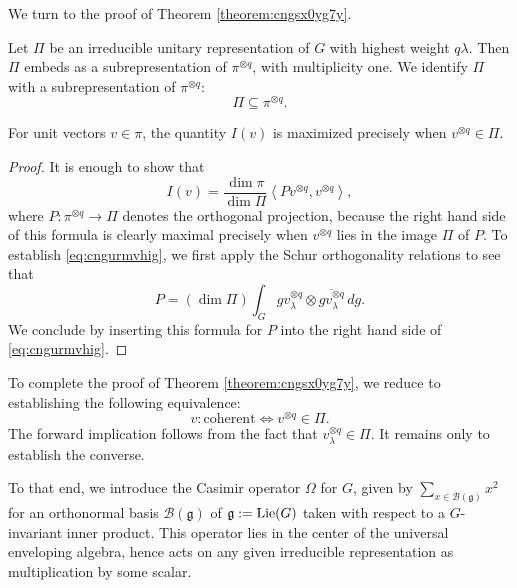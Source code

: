 \documentclass[reqno]{amsart} 
\begin{document}
We turn to the proof of Theorem \ref{theorem:cngsx0yg7y}.

Let $\Pi$ be an irreducible unitary representation of $G$ with highest weight $q \lambda$.  Then $\Pi$ embeds as a subrepresentation of $\pi^{\otimes q}$, with multiplicity one.  We identify $\Pi$ with a subrepresentation of $\pi^{\otimes q}$:
\begin{equation*}
  \Pi \subseteq  \pi^{\otimes q}. 
\end{equation*}
\begin{lemma}\label{lemma:cngurf0apf}
  For unit vectors $v \in \pi$, the quantity $I(v)$ is maximized precisely when $v^{\otimes q} \in \Pi$.
\end{lemma}
\begin{proof}
  It is enough to show that
  \begin{equation}\label{eq:cngurmvhig}
    I(v) = \frac{\dim \pi}{\dim \Pi}
    \left\langle P v^{\otimes q}, v^{\otimes q} \right\rangle,
  \end{equation}
  where $P : \pi^{\otimes q} \rightarrow \Pi$ denotes the orthogonal projection, because the right hand side of this formula is clearly maximal precisely when $v^{\otimes q}$ lies in the image $\Pi$ of $P$.  To establish \eqref{eq:cngurmvhig}, we first apply the Schur orthogonality relations to see that
  \begin{equation*}
    P =(\dim \Pi) \int_{G} g v_\lambda^{\otimes q}
    \otimes \overline{g v_\lambda^{\otimes q}} \, d g. 
  \end{equation*}
  We conclude by inserting this formula for $P$ into the right hand side of \eqref{eq:cngurmvhig}.
\end{proof}

To complete the proof of Theorem \ref{theorem:cngsx0yg7y}, we reduce to establishing the following equivalence:
\begin{equation}\label{eq:cngsx4hl1k}
  v:\text{coherent} \iff v^{\otimes q} \in \Pi.
\end{equation}
The forward implication follows from the fact that $v_{\lambda}^{\otimes q} \in \Pi$.  It remains only to establish the converse.

To that end, we introduce the Casimir operator $\Omega$ for $G$, given by $\sum_{x \in \mathcal{B}(\mathfrak{g})} x^2$ for an orthonormal basis $\mathcal{B}(\mathfrak{g})$ of $\mathfrak{g} := \operatorname{Lie}(G)$ taken with respect to a $G$-invariant inner product.  This operator lies in the center of the universal enveloping algebra, hence acts on any given irreducible representation as multiplication by some scalar.
\end{document}
